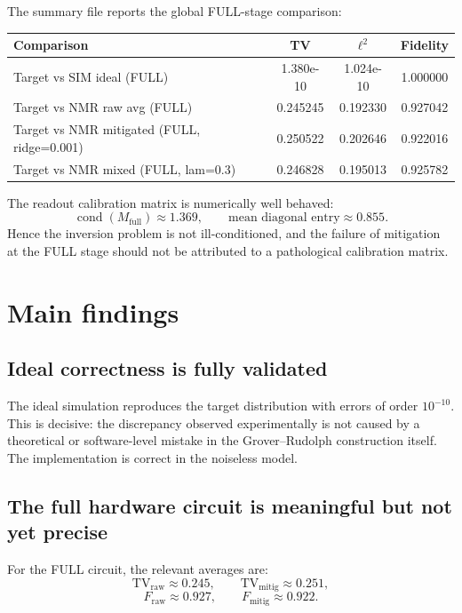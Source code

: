 \documentclass[11pt]{article}
\begin{document}
The summary file reports the global FULL-stage comparison:
\begin{center}
\begin{tabular}{lccc}
\toprule
Comparison & TV & $\ell^2$ & Fidelity \\
\midrule
Target vs SIM ideal (FULL) & 1.380e-10 & 1.024e-10 & 1.000000 \\
Target vs NMR raw avg (FULL) & 0.245245 & 0.192330 & 0.927042 \\
Target vs NMR mitigated (FULL, ridge=0.001) & 0.250522 & 0.202646 & 0.922016 \\
Target vs NMR mixed (FULL, lam=0.3) & 0.246828 & 0.195013 & 0.925782 \\
\bottomrule
\end{tabular}
\end{center}

The readout calibration matrix is numerically well behaved:
\[
\operatorname{cond}(M_{\mathrm{full}})\approx 1.369,
\qquad
\text{mean diagonal entry}\approx 0.855.
\]
Hence the inversion problem is not ill-conditioned, and the failure of mitigation at the FULL stage should not be attributed to a pathological calibration matrix.

\section{Main findings}

\subsection{Ideal correctness is fully validated}

The ideal simulation reproduces the target distribution with errors of order $10^{-10}$. This is decisive: the discrepancy observed experimentally is not caused by a theoretical or software-level mistake in the Grover--Rudolph construction itself. The implementation is correct in the noiseless model.

\subsection{The full hardware circuit is meaningful but not yet precise}

For the FULL circuit, the relevant averages are:
\[
\mathrm{TV}_{\mathrm{raw}} \approx 0.245,
\qquad
\mathrm{TV}_{\mathrm{mitig}} \approx 0.251,
\]
\[
F_{\mathrm{raw}} \approx 0.927,
\qquad
F_{\mathrm{mitig}} \approx 0.922.
\]
\end{document}
